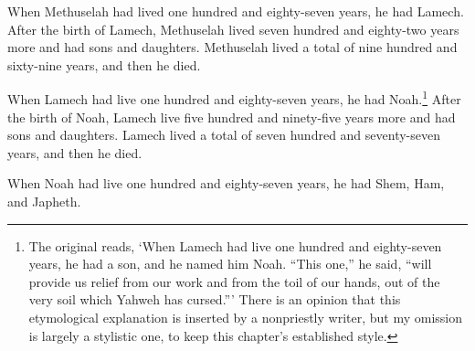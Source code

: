 When Methuselah had lived one hundred and eighty-seven years,
he had Lamech.
After the birth of Lamech,
Methuselah lived seven hundred and eighty-two years more
and had sons and daughters.
Methuselah lived
a total of nine hundred and sixty-nine years,
and then he died.

When Lamech had live one hundred and eighty-seven years,
he had Noah.\footnote{
    The original reads,
    `When Lamech had live one hundred and eighty-seven years,
    he had a son,
    and he named him Noah.
    ``This one,'' he said, 
    ``will provide us relief from our work
    and from the toil of our hands,
    out of the very soil which Yahweh has cursed.'''
    There is an opinion that this etymological explanation 
    is inserted by a nonpriestly writer,
    but my omission is largely a stylistic one,
    to keep this chapter's established style.
}
After the birth of Noah, 
Lamech live five hundred and ninety-five years more 
and had sons and daughters. 
Lamech lived
a total of seven hundred and seventy-seven years,
and then he died.

When Noah had live one hundred and eighty-seven years,
he had Shem, Ham, and Japheth.
